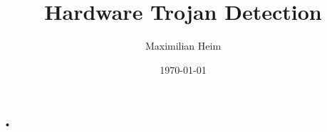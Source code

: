 \documentclass[11pt]{beamer}
\author{Maximilian Heim}
\title{Hardware Trojan Detection}
\institute{University Albstadt-Sigmaringen}
\date{\today}
\begin{document}
\begin{frame}
\titlepage
\end{frame}

\begin{frame}
\tableofcontents
\end{frame}

\begin{frame}{•}

\end{frame}
\end{document}
